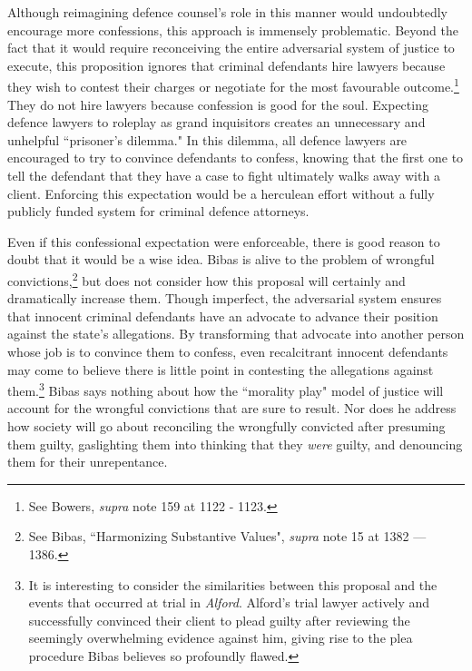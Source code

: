 Although reimagining defence counsel's role in this manner would undoubtedly encourage more confessions, this approach is immensely problematic. Beyond the fact that it would require reconceiving the entire adversarial system of justice to execute, this proposition ignores that criminal defendants hire lawyers because they wish to contest their charges or negotiate for the most favourable outcome.\footnote{See Bowers, \textit{supra} note 159 at 1122 - 1123.} They do not hire lawyers because confession is good for the soul. Expecting defence lawyers to roleplay as grand inquisitors creates an unnecessary and unhelpful ``prisoner's dilemma." In this dilemma, all defence lawyers are encouraged to try to convince defendants to confess, knowing that the first one to tell the defendant that they have a case to fight ultimately walks away with a client. Enforcing this expectation would be a herculean effort without a fully publicly funded system for criminal defence attorneys.

Even if this confessional expectation were enforceable, there is good reason to doubt that it would be a wise idea. Bibas is alive to the problem of wrongful convictions,\footnote{See Bibas, ``Harmonizing Substantive Values", \textit{supra} note 15 at 1382 — 1386.} but does not consider how this proposal will certainly and dramatically increase them. Though imperfect, the adversarial system ensures that innocent criminal defendants have an advocate to advance their position against the state's allegations. By transforming that advocate into another person whose job is to convince them to confess, even recalcitrant innocent defendants may come to believe there is little point in contesting the allegations against them.\footnote{It is interesting to consider the similarities between this proposal and the events that occurred at trial in \textit{Alford}. Alford's trial lawyer actively and successfully convinced their client to plead guilty after reviewing the seemingly overwhelming evidence against him, giving rise to the plea procedure Bibas believes so profoundly flawed.} Bibas says nothing about how the ``morality play" model of justice will account for the wrongful convictions that are sure to result. Nor does he address how society will go about reconciling the wrongfully convicted after presuming them guilty, gaslighting them into thinking that they \textit{were} guilty, and denouncing them for their unrepentance. 

